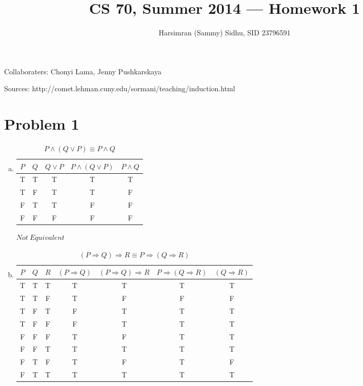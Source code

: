 \documentclass[11pt,letterpaper]{article}
\title{CS 70, Summer 2014 --- Homework 1} %
\author{Harsimran (Sammy) Sidhu, SID 23796591} %
\begin{document}
\maketitle

Collaboraters: Chonyi Lama, Jenny Pushkarskaya

Sources: http://comet.lehman.cuny.edu/sormani/teaching/induction.html

\section*{Problem 1} %

\begin{enumerate}[(a)]

\item
\begin{table}[h] 
\caption{$P\wedge (Q\vee P) \equiv P \wedge Q$} %
\centering %
\begin{tabular}{c c c c c} %
\hline %
$P$ & $Q$ & $Q\vee{P}$ & $P\wedge{(Q\vee P)}$ & $P\wedge Q$ \\ %
\hline %
T & T & T & T & T \\
T & F & T & T & F \\
F & T & T & F & F \\
F & F & F & F & F \\ %
\hline %
\end{tabular} 
\label{table:1a} %
\end{table}

$Not~Equivalent$


\item 

\begin{table}[h] 
\caption{$(P\Rightarrow Q)\Rightarrow R \equiv P\Rightarrow (Q\Rightarrow R)$} %
\centering %
\begin{tabular}{c c c c c c c} %
\hline %
$P$ & $Q$ & $R$ \vline & $(P\Rightarrow Q)$ \vline & $(P\Rightarrow Q)\Rightarrow R$ \vline & $P\Rightarrow (Q\Rightarrow R)$ \vline & $(Q\Rightarrow R)$ \\ %
\hline %
T & T & T & T & T & T & T\\
T & T & F & T & F & F & F\\
T & F & T & F & T & T & T\\
T & F & F & F & T & T & T\\
F & F & F & T & F & T & T\\
F & F & T & T & T & T & T\\
F & T & F & T & F & T & F\\
F & T & T & T & T & T & T\\
\hline %
\end{tabular} 
\label{table:1a} %
\end{table}


\end{enumerate}
\end{document}
